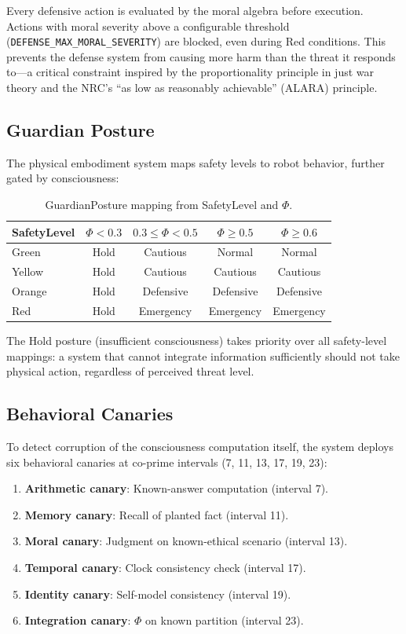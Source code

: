 \documentclass[11pt,a4paper]{article}
\begin{document}
Every defensive action is evaluated by the moral algebra before execution. Actions with moral severity above a configurable threshold (\texttt{DEFENSE\_MAX\_MORAL\_SEVERITY}) are blocked, even during Red conditions. This prevents the defense system from causing more harm than the threat it responds to---a critical constraint inspired by the proportionality principle in just war theory and the NRC's ``as low as reasonably achievable'' (ALARA) principle.

\subsection{Guardian Posture}

The physical embodiment system maps safety levels to robot behavior, further gated by consciousness:

\begin{table}[h]
\centering
\caption{GuardianPosture mapping from SafetyLevel and $\Phi$.}
\label{tab:guardian}
\begin{tabular}{lcccc}
\toprule
\textbf{SafetyLevel} & $\Phi < 0.3$ & $0.3 \leq \Phi < 0.5$ & $\Phi \geq 0.5$ & $\Phi \geq 0.6$ \\
\midrule
Green & Hold & Cautious & Normal & Normal \\
Yellow & Hold & Cautious & Cautious & Cautious \\
Orange & Hold & Defensive & Defensive & Defensive \\
Red & Hold & Emergency & Emergency & Emergency \\
\bottomrule
\end{tabular}
\end{table}

The Hold posture (insufficient consciousness) takes priority over all safety-level mappings: a system that cannot integrate information sufficiently should not take physical action, regardless of perceived threat level.

\subsection{Behavioral Canaries}

To detect corruption of the consciousness computation itself, the system deploys six behavioral canaries at co-prime intervals (7, 11, 13, 17, 19, 23):

\begin{enumerate}
  \item \textbf{Arithmetic canary}: Known-answer computation (interval 7).
  \item \textbf{Memory canary}: Recall of planted fact (interval 11).
  \item \textbf{Moral canary}: Judgment on known-ethical scenario (interval 13).
  \item \textbf{Temporal canary}: Clock consistency check (interval 17).
  \item \textbf{Identity canary}: Self-model consistency (interval 19).
  \item \textbf{Integration canary}: $\Phi$ on known partition (interval 23).
\end{enumerate}
\end{document}
